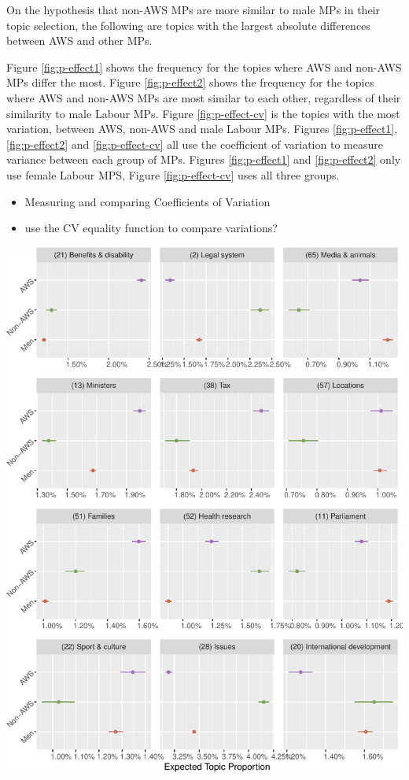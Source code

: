 \documentclass[]{article}
\let\origfigure\figure
\let\endorigfigure\endfigure
\renewenvironment{figure}[1][2] {
    \expandafter\origfigure\expandafter[H]
} {
    \endorigfigure
}
\theoremstyle{definition}
\theoremstyle{definition}
\theoremstyle{definition}
\theoremstyle{remark}
\begin{document}
On the hypothesis that non-AWS MPs are more similar to male MPs in their
topic selection, the following are topics with the largest absolute
differences between AWS and other MPs.

Figure \ref{fig:p-effect1} shows the frequency for the topics where AWS
and non-AWS MPs differ the most. Figure \ref{fig:p-effect2} shows the
frequency for the topics where AWS and non-AWS MPs are most similar to
each other, regardless of their similarity to male Labour MPs. Figure
\ref{fig:p-effect-cv} is the topics with the most variation, between
AWS, non-AWS and male Labour MPs. Figures \ref{fig:p-effect1},
\ref{fig:p-effect2} and \ref{fig:p-effect-cv} all use the coefficient of
variation to measure variance between each group of MPs. Figures
\ref{fig:p-effect1} and \ref{fig:p-effect2} only use female Labour MPS,
Figure \ref{fig:p-effect-cv} uses all three groups.

\begin{itemize}
\item
  Measuring and comparing Coefficients of Variation
\item
  use the CV equality function to compare variations?
\end{itemize}

\begin{figure}
\centering
\includegraphics{methodology_files/figure-latex/p-effect1-1.pdf}
\caption{\label{fig:p-effect1}Where AWS MPs are most distinct from non-AWS
female MPs}
\end{figure}
\end{document}
